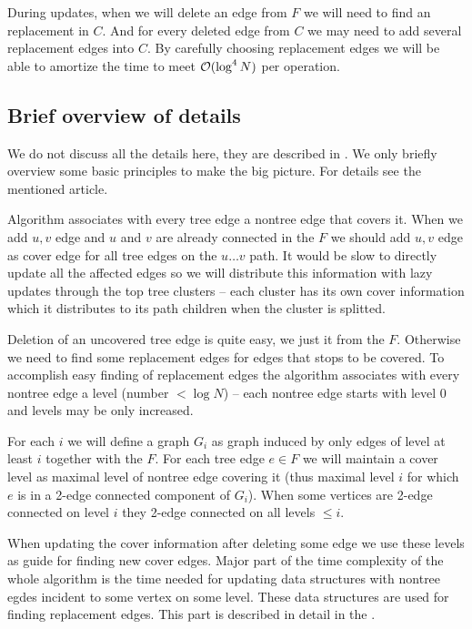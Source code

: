 During updates, when we will delete an edge from $F$ we will need to find an
replacement in $C$. And for every deleted edge from $C$ we may need to add
several replacement edges into $C$. By carefully choosing replacement
edges we will be able to amortize the time to meet ${\cal O}(\log^4 N)$ per operation.

\subsection{Brief overview of details}

We do not discuss all the details here, they are described in \cite{PolylogarithmicAlgorithmsForConnectivity}. We only briefly overview some basic
principles to make the big picture. For details see the mentioned article.

Algorithm associates with every tree edge a nontree edge that covers it. When we
add $u,v$ edge and $u$ and $v$ are already connected in the $F$ we should add
$u,v$ edge as cover edge for all tree edges on the $u\dots v$ path. It would be
slow to directly update all the affected edges so we will distribute this
information with lazy updates through the top tree clusters -- each cluster has
its own cover information which it distributes to its path children when the
cluster is splitted.

Deletion of an uncovered tree edge is quite easy, we just \Cut{} it from the
$F$. Otherwise we need to find some replacement edges for edges that stops to be
covered. To accomplish easy finding of replacement edges the algorithm
associates with every nontree edge a level (number $< \log N$) -- each nontree
edge starts with level 0 and levels may be only increased.

For each $i$ we will define a graph $G_i$ as graph induced by only edges of
level at least $i$ together with the $F$. For each tree edge $e \in F$ we will
maintain a cover level as maximal level of nontree edge covering it (thus
maximal level $i$ for which $e$ is in a 2-edge connected component of $G_i$).
When some vertices are 2-edge connected on level $i$ they 2-edge connected on
all levels $\le i$.

When updating the cover information after deleting some edge we use these levels
as guide for finding new cover edges. Major part of the time complexity of the
whole algorithm is the time needed for updating data structures with nontree
egdes incident to some vertex on some level. These data structures are used for
finding replacement edges. This part is described in detail in the \cite{PolylogarithmicAlgorithmsForConnectivity}.

